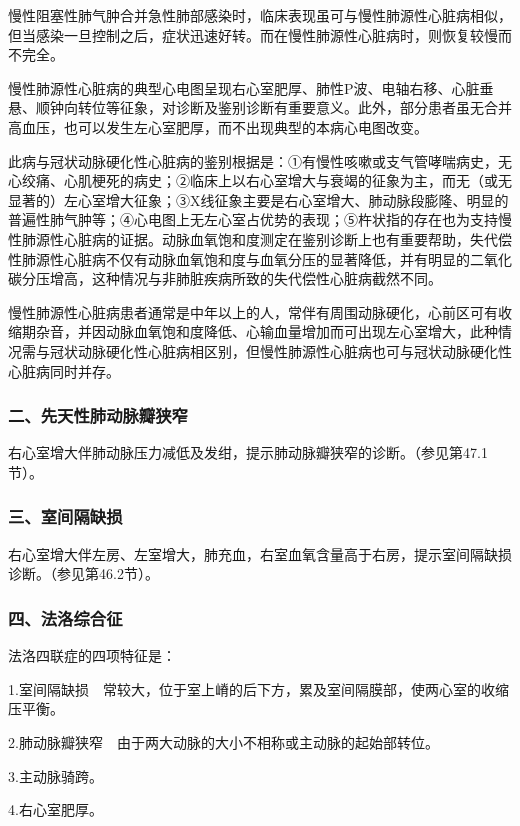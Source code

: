 慢性阻塞性肺气肿合并急性肺部感染时，临床表现虽可与慢性肺源性心脏病相似，但当感染一旦控制之后，症状迅速好转。而在慢性肺源性心脏病时，则恢复较慢而不完全。

慢性肺源性心脏病的典型心电图呈现右心室肥厚、肺性P波、电轴右移、心脏垂悬、顺钟向转位等征象，对诊断及鉴别诊断有重要意义。此外，部分患者虽无合并高血压，也可以发生左心室肥厚，而不出现典型的本病心电图改变。

此病与冠状动脉硬化性心脏病的鉴别根据是：①有慢性咳嗽或支气管哮喘病史，无心绞痛、心肌梗死的病史；②临床上以右心室增大与衰竭的征象为主，而无（或无显著的）左心室增大征象；③X线征象主要是右心室增大、肺动脉段膨隆、明显的普遍性肺气肿等；④心电图上无左心室占优势的表现；⑤杵状指的存在也为支持慢性肺源性心脏病的证据。动脉血氧饱和度测定在鉴别诊断上也有重要帮助，失代偿性肺源性心脏病不仅有动脉血氧饱和度与血氧分压的显著降低，并有明显的二氧化碳分压增高，这种情况与非肺脏疾病所致的失代偿性心脏病截然不同。

慢性肺源性心脏病患者通常是中年以上的人，常伴有周围动脉硬化，心前区可有收缩期杂音，并因动脉血氧饱和度降低、心输血量增加而可出现左心室增大，此种情况需与冠状动脉硬化性心脏病相区别，但慢性肺源性心脏病也可与冠状动脉硬化性心脏病同时并存。

\subsubsection{二、先天性肺动脉瓣狭窄}

右心室增大伴肺动脉压力减低及发绀，提示肺动脉瓣狭窄的诊断。（参见第47.1节）。

\subsubsection{三、室间隔缺损}

右心室增大伴左房、左室增大，肺充血，右室血氧含量高于右房，提示室间隔缺损诊断。（参见第46.2节）。

\subsubsection{四、法洛综合征}

法洛四联症的四项特征是：

1.室间隔缺损　常较大，位于室上嵴的后下方，累及室间隔膜部，使两心室的收缩压平衡。

2.肺动脉瓣狭窄　由于两大动脉的大小不相称或主动脉的起始部转位。

3.主动脉骑跨。

4.右心室肥厚。

